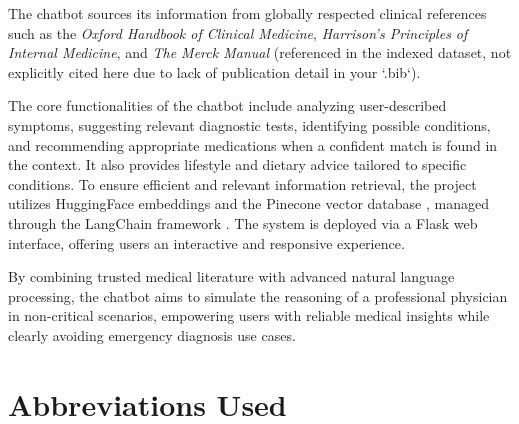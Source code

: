 \documentclass[12pt,a4paper]{report}
\begin{document}
The chatbot sources its information from globally respected clinical references such as the \textit{Oxford Handbook of Clinical Medicine}, \textit{Harrison’s Principles of Internal Medicine}, and \textit{The Merck Manual} (referenced in the indexed dataset, not explicitly cited here due to lack of publication detail in your `.bib`). 

The core functionalities of the chatbot include analyzing user-described symptoms, suggesting relevant diagnostic tests, identifying possible conditions, and recommending appropriate medications when a confident match is found in the context. It also provides lifestyle and dietary advice tailored to specific conditions. To ensure efficient and relevant information retrieval, the project utilizes HuggingFace embeddings \cite{sentence_transformers} and the Pinecone vector database \cite{pinecone}, managed through the LangChain framework \cite{langchain}. The system is deployed via a Flask web interface, offering users an interactive and responsive experience.

By combining trusted medical literature with advanced natural language processing, the chatbot aims to simulate the reasoning of a professional physician in non-critical scenarios, empowering users with reliable medical insights while clearly avoiding emergency diagnosis use cases.





\cleardoublepage



		\tableofcontents

			\chapter*{\centering Abbreviations Used }
		\label{Abbreviations Used}
		
		
\end{document}
